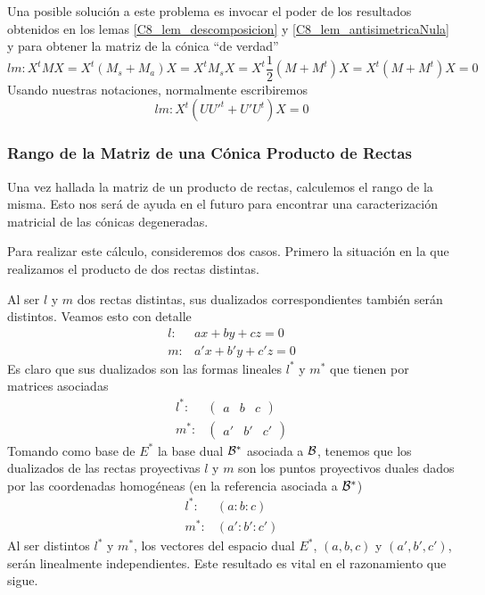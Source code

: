 Una posible solución a este problema es invocar el poder de los resultados obtenidos en los lemas \ref{C8_lem_descomposicion} y \ref{C8_lem_antisimetricaNula} y para obtener la matriz de la cónica ``de verdad''
\begin{equation*}lm:X^tMX=X^t(M_s+M_a)X=X^tM_sX=X^t\frac{1}{2}(M+M^t)X=X^t(M+M^t)X=0\end{equation*}
Usando nuestras notaciones, normalmente escribiremos
\begin{equation}
	lm:X^t(UU'^t+U'U^t)X=0
\end{equation}
\subsubsection{Rango de la Matriz de una Cónica Producto de Rectas}
Una vez hallada la matriz de un producto de rectas, calculemos el rango de la misma. Esto nos será de ayuda en el futuro para encontrar una caracterización matricial de las cónicas degeneradas.

Para realizar este cálculo, consideremos dos casos. Primero la situación en la que realizamos el producto de dos rectas distintas.

Al ser $l$ y $m$ dos rectas distintas, sus dualizados correspondientes también serán distintos. Veamos esto con detalle
\[\begin{array}{cc}
l: & ax+by+cz=0\\
m: & a'x+b'y+c'z=0
\end{array}\]
Es claro que sus dualizados son las formas lineales $l^*$ y $m^*$ que tienen por matrices asociadas
\[\begin{array}{cc}
l^*: & \begin{pmatrix}
a & b & c
\end{pmatrix}\\
m^*: & \begin{pmatrix}
a' & b' & c'
\end{pmatrix}
\end{array}\]
Tomando como base de $E^*$ la base dual $\mathcal{B}^*$ asociada a $\mathcal{B}$, tenemos que los dualizados de las rectas proyectivas $l$ y $m$ son los puntos proyectivos duales dados por las coordenadas homogéneas (en la referencia asociada a $\mathcal{B}^*$)
\[\begin{array}{cc}
l^*: & (a:b:c)\\
m^*: & (a':b':c')
\end{array}\]
Al ser distintos $l^*$ y $m^*$, los vectores del espacio dual $E^*$, $(a,b,c)$ y $(a', b',c')$, serán linealmente independientes. Este resultado es vital en el razonamiento que sigue.

